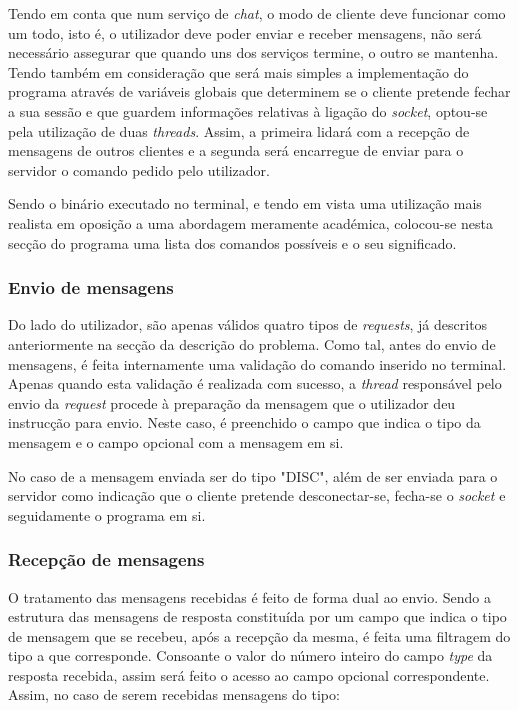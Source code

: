 \documentclass[a4paper]{article}
\begin{document}
Tendo em conta que num serviço de \textit{chat}, o modo de cliente deve funcionar como um todo, isto é, o utilizador deve poder enviar e receber mensagens, não será necessário assegurar que quando uns dos serviços termine, o outro se mantenha. Tendo também em consideração que será mais simples a implementação do programa através de variáveis globais que determinem se o cliente pretende fechar a sua sessão e que guardem informações relativas à ligação do \textit{socket}, optou-se pela utilização de duas \textit{threads}. Assim, a primeira lidará com a recepção de mensagens de outros clientes e a segunda será encarregue de enviar para o servidor o comando pedido pelo utilizador.

Sendo o binário executado no terminal, e tendo em vista uma utilização mais realista em oposição a uma abordagem meramente académica, colocou-se nesta secção do programa uma lista dos comandos possíveis e o seu significado.

\subsubsection{Envio de mensagens}
Do lado do utilizador, são apenas válidos quatro tipos de \textit{requests}, já descritos anteriormente na secção da descrição do problema. 
Como tal, antes do envio de mensagens, é feita internamente uma validação do comando inserido no terminal. Apenas quando esta validação é realizada com sucesso, a \textit{thread} responsável pelo envio da \textit{request} procede à preparação da mensagem que o utilizador deu instrucção para envio. Neste caso, é preenchido o campo que indica o tipo da mensagem e o campo opcional com a mensagem em si.

No caso de a mensagem enviada ser do tipo "DISC", além de ser enviada para o servidor como indicação que o cliente pretende desconectar-se, fecha-se o \textit{socket} e seguidamente o programa em si.
\subsubsection{Recepção de mensagens}
O tratamento das mensagens recebidas é feito de forma dual ao envio. Sendo a estrutura das mensagens de resposta constituída por um campo que indica o tipo de mensagem que se recebeu, após a recepção da mesma, é feita uma filtragem do tipo a que corresponde. Consoante o valor do número inteiro do campo \textit{type} da resposta recebida, assim será feito o acesso ao campo opcional correspondente. Assim, no caso de serem recebidas mensagens do tipo:
\end{document}
